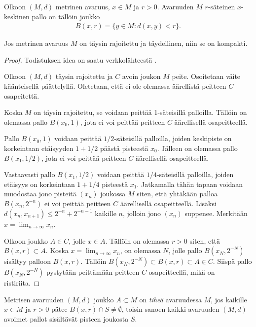 \documentclass[12pt,oneside,a4paper]{amsbook} %
\begin{document}
\begin{definition}
    Olkoon $(M, d)$ metrinen avaruus, $x \in M$ ja $r > 0$. Avaruuden $M$ $r$-säteinen $x$-keskinen pallo on tällöin joukko
    \begin{align*}
        B(x, r) = \{y \in M : d(x, y) < r\}.
    \end{align*}
\end{definition}

\begin{theorem}\label{thm:compactness}
    Jos metrinen avaruus $M$ on täysin rajoitettu ja täydellinen, niin se on kompakti.
\end{theorem}
\begin{proof}
Todistuksen idea on saatu verkkolähteestä \cite{gibara}.

Olkoon $(M, d)$ täysin rajoitettu ja $C$ avoin joukon $M$ peite. Osoitetaan väite käänteisellä päättelyllä. Oletetaan, että ei ole olemassa äärellistä peitteen $C$ osapeitettä.

Koska $M$ on täysin rajoitettu, se voidaan peittää 1-säteisillä palloilla. Tällöin on olemassa pallo $B(x_0,1)$, jota ei voi peittää peitteen $C$ äärellisellä osapeitteellä.

Pallo $B(x_0,1)$ voidaan peittää $1/2$-säteisillä palloilla, joiden keskipiste on korkeintaan etäisyyden $1 + 1/2$ päästä pisteestä $x_0$. Jälleen on olemassa pallo $B(x_1, 1/2)$, jota ei voi peittää peitteen $C$ äärellisellä osapeitteellä.

Vastaavasti pallo $B(x_1, 1/2)$ voidaan peittää $1/4$-säteisillä palloilla, joiden etäisyys on korkeintaan $1+1/4$ pisteestä $x_1$. Jatkamalla tähän tapaan voidaan muodostaa jono pisteitä $(x_n)$ joukossa $M$ siten, että yhtäkään palloa $B(x_n, 2^{-n})$ ei voi peittää peitteen $C$ äärellisellä osapeitteellä. Lisäksi $d(x_n, x_{n+1})  \le 2^{-n} + 2^{-n-1}$ kaikille $n$, jolloin jono $(x_n)$ suppenee. Merkitään $x = \lim_{n\to\infty} x_n$.

Olkoon joukko $A \in C$, jolle $x \in A$. Tällöin on olemassa $r > 0$ siten, että $B(x,r) \subset A$. Koska $x = \lim_{n\to\infty} x_n$, on olemassa $N$, jolle pallo $B(x_N, 2^{-N})$ sisältyy palloon $B(x, r)$. Tällöin $B(x_N, 2^{-N}) \subset B(x, r) \subset A \in C$. Siispä pallo $B(x_N, 2^{-N})$ pystytään peittämään peitteen $C$ osapeitteellä, mikä on ristiriita.
\end{proof}

\begin{definition}
    Metrisen avaruuden $(M, d)$ joukko $A \subset M$ on \textit{tiheä} avaruudessa $M$, jos kaikille $x \in M$ ja $r > 0$ pätee $B(x, r) \cap S \ne \emptyset$, toisin sanoen kaikki avaruuden $(M, d)$ avoimet pallot sisältävät pisteen joukosta $S$.
\end{definition}
\end{document}
